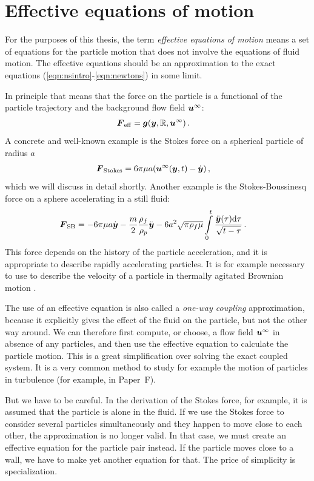 \documentclass[thesis.tex]{subfiles}
\begin{document}
\section{Effective equations of motion}

For the purposes of this thesis, the term \emph{effective equations of motion} means a set of equations for the particle motion that does not involve the equations of fluid motion. The effective equations should be an approximation to the exact equations (\ref{eqn:nsintro}-\ref{eqn:newtons}) in some limit.

In principle that means that the force on the particle is a functional of the particle trajectory and the background flow field $\mbox{\boldmath$u$}^\infty$:
\begin{align}
	\mbox{\boldmath$F$}_{\mathrm{eff}} &= \mbox{\boldmath$g$}(\mbox{\boldmath$y$}, \mathbb{R}, \mbox{\boldmath$u$}^\infty)\,.
\end{align}
A concrete and well-known example is the Stokes force on a spherical particle of radius $a$
\begin{align}
	\ve F_{\mathrm{Stokes}} &= 6\pi\mu a (\ve u^\infty(\ve y, t)-\dot{\ve y})\,,\eqnlab{stokesforce}
\end{align}
which we will discuss in detail shortly. Another example is the Stokes-Boussinesq force on a sphere accelerating in a still fluid:
\begin{align}
	\ve F_{\mathrm{SB}} &= -6\pi\mu a\dot{\ve y} - \frac{m}{2}\frac{\rho_f}{\rho_p} \ddot{\ve y}-6a^2\sqrt{\pi\rho_f\mu} \int\limits_0^t\frac{\ddot{\ve y}(\tau)\rd \tau}{\sqrt{t-\tau}}\,.\eqnlab{FSB}
\end{align}
This force depends on the history of the particle acceleration, and it is appropriate to describe rapidly accelerating particles. It is for example necessary to use  to describe the velocity of a particle in thermally agitated Brownian motion \cite{clercx1992,kheifets2014}.

The use of an effective equation is also called a \emph{one-way coupling} approximation, because it explicitly gives the effect of the fluid on the particle, but not the other way around. We can therefore first compute, or choose, a flow field $\mbox{\boldmath$u$}^\infty$ in absence of any particles, and then use the effective equation to calculate the particle motion. This is a great simplification over solving the exact coupled system. It is a very common method to study for example the motion of particles in turbulence (for example, in Paper~F).

But we have to be careful. In the derivation of the Stokes force, for example, it is assumed that the particle is alone in the fluid. If we use the Stokes force to consider several particles simultaneously and they happen to move close to each other, the approximation is no longer valid. In that case, we must create an effective equation for the particle pair instead. If the particle moves close to a wall, we have to make yet another equation for that. The price of simplicity is specialization.
\end{document}
